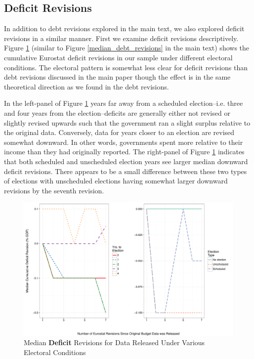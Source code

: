 \documentclass[]{article}
\begin{document}
\subsection*{Deficit Revisions}

In addition to debt revisions explored in the main text, we also explored deficit revisions in a similar manner. First we examine deficit revisions descriptively. Figure \ref{median_deficit_revisions} (similar to Figure \ref{median_debt_revisions} in the main text) shows the cumulative Eurostat deficit revisions in our sample under different electoral conditions. The electoral pattern is somewhat less clear for deficit revisions than debt revisions discussed in the main paper though the effect is in the same theoretical direction as we found in the debt revisions.

In the left-panel of Figure \ref{median_deficit_revisions} years far away from a scheduled election--i.e. three and four years from the election--deficits are generally either not revised or slightly revised upwards such that the government ran a slight surplus relative to the original data. Conversely, data for years closer to an election are revised somewhat downward. In other words, governments spent more relative to their income than they had originally reported. The right-panel of Figure \ref{median_deficit_revisions} indicates that both scheduled and unscheduled election years see larger median downward deficit revisions. There appears to be a small difference between these two types of elections with unscheduled elections having somewhat larger downward revisions by the seventh revision.

\begin{figure}
    \begin{center}
        \caption{Median \textbf{Deficit} Revisions for Data Released Under Various Electoral Conditions}
        \label{median_deficit_revisions}
        \includegraphics[scale=0.55]{figures/median_deficit_revisions.pdf}
    \end{center}
\end{figure}
\end{document}
